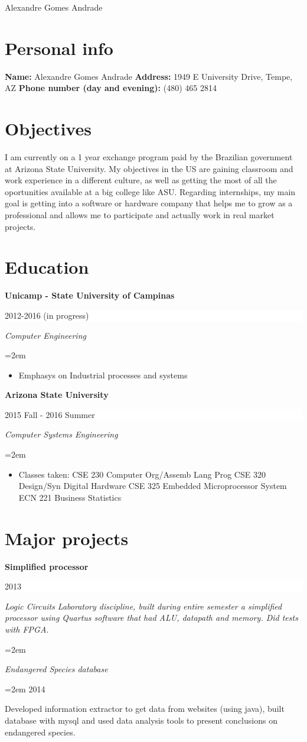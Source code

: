 \documentclass[paper=a4,fontsize=11pt]{scrartcl} %
\newcommand{\MyName}[1]{ %
        \Huge \hfill #1
        \par \normalsize \normalfont}
\newcommand{\NewPart}[1]{\section*{{#1}}}
\newcommand{\EducationEntry}[4]{
        \noindent \textbf{#1} \hfill      %
        \colorbox{White}{%
            \parbox{5cm}{%
            \hfill\color{Black}#2}} \par  %
        \noindent \textit{#3} \par        %
        \noindent\hangindent=2em\hangafter=0 \small #4 %
        \normalsize \par}
\begin{document}

\MyName{Alexandre Gomes Andrade}


\NewPart{Personal info}{}

\textbf{Name:} Alexandre Gomes Andrade \newline
\textbf{Address:} 1949 E University Drive, Tempe, AZ \newline
\textbf{Phone number (day and evening):} (480) 465 2814 

\NewPart{Objectives}{}
I am currently on a 1 year exchange program paid by the Brazilian government at Arizona State University. My objectives in the US are gaining classroom and work experience in a different culture, as well as getting the most of all the oportunities available at a big college like ASU. Regarding internships, my main goal is getting into a software or hardware company that helps me to grow as a professional and allows me to participate and actually work in real market projects.

\NewPart{Education}{}
\EducationEntry{Unicamp - State University of Campinas}{2012-2016 (in progress)}{Computer Engineering}{
    \begin{itemize}
        \item{Emphasys on Industrial processes and systems}
    \end{itemize}
}
\EducationEntry{Arizona State University}{2015 Fall - 2016 Summer}{Computer Systems Engineering}{
    \begin{itemize}
        \item{Classes taken: \newline CSE 230 Computer Org/Assemb Lang Prog\newline
            CSE 320 Design/Syn Digital Hardware\newline         
            CSE 325 Embedded Microprocessor System\newline
            ECN 221 Business Statistics\newline }
    \end{itemize}
}
\NewPart{Major projects}{}
\EducationEntry{Simplified processor}{2013}{Logic Circuits Laboratory discipline, built during entire semester a simplified processor using Quartus software that had ALU, datapath and memory. Did tests with FPGA.}
\EducationEntry{Endangered Species database}{2014}{Developed information extractor to get data from websites (using java), built database with mysql and used data analysis tools to present conclusions on endangered species.}
\end{document}

